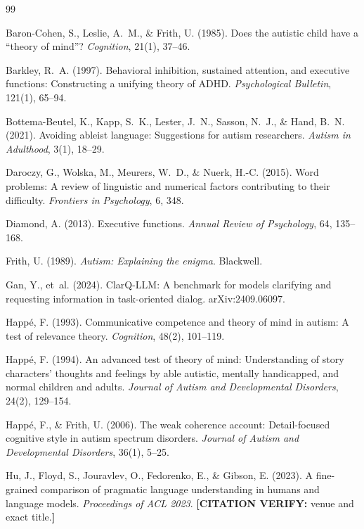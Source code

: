 \documentclass[11pt,letterpaper]{article}
\newcommand{\citeverify}[1]{{\color{orange}\textbf{[CITATION VERIFY:} #1\textbf{]}}}
\begin{document}
\begin{thebibliography}{99}

Baron-Cohen, S., Leslie, A.~M., \& Frith, U. (1985). Does the autistic child have a ``theory of mind''? \emph{Cognition}, 21(1), 37--46.

Barkley, R.~A. (1997). Behavioral inhibition, sustained attention, and executive functions: Constructing a unifying theory of ADHD. \emph{Psychological Bulletin}, 121(1), 65--94.

Bottema-Beutel, K., Kapp, S.~K., Lester, J.~N., Sasson, N.~J., \& Hand, B.~N. (2021). Avoiding ableist language: Suggestions for autism researchers. \emph{Autism in Adulthood}, 3(1), 18--29.

Daroczy, G., Wolska, M., Meurers, W.~D., \& Nuerk, H.-C. (2015). Word problems: A review of linguistic and numerical factors contributing to their difficulty. \emph{Frontiers in Psychology}, 6, 348.

Diamond, A. (2013). Executive functions. \emph{Annual Review of Psychology}, 64, 135--168.

Frith, U. (1989). \emph{Autism: Explaining the enigma}. Blackwell.

Gan, Y., et~al. (2024). ClarQ-LLM: A benchmark for models clarifying and requesting information in task-oriented dialog. arXiv:2409.06097.

Happé, F. (1993). Communicative competence and theory of mind in autism: A test of relevance theory. \emph{Cognition}, 48(2), 101--119.

Happé, F. (1994). An advanced test of theory of mind: Understanding of story characters' thoughts and feelings by able autistic, mentally handicapped, and normal children and adults. \emph{Journal of Autism and Developmental Disorders}, 24(2), 129--154.

Happé, F., \& Frith, U. (2006). The weak coherence account: Detail-focused cognitive style in autism spectrum disorders. \emph{Journal of Autism and Developmental Disorders}, 36(1), 5--25.

Hu, J., Floyd, S., Jouravlev, O., Fedorenko, E., \& Gibson, E. (2023). A fine-grained comparison of pragmatic language understanding in humans and language models. \emph{Proceedings of ACL 2023}. \citeverify{venue and exact title.}


\end{thebibliography}
\end{document}

